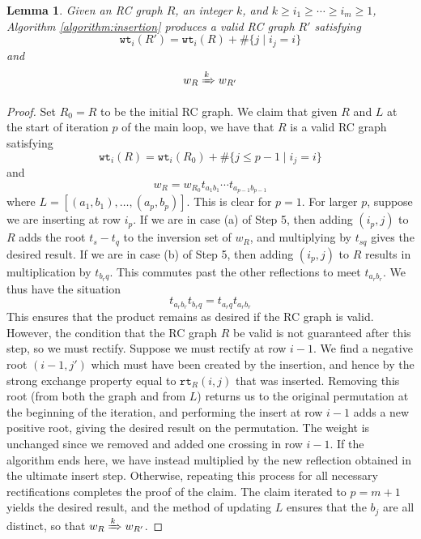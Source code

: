 \documentclass[a4paper,fleqn]{cas-sc}
\newtheorem{lemma}{Lemma}[subsection]
\theoremstyle{definition}
\theoremstyle{remark}
\numberwithin{equation}{subsection}
\newcommand{\wof}[1]{w_{#1}}
\newcommand{\wtt}{\mathtt{wt}}
\newcommand{\Tom}[1]{\xRightarrow{#1}}
\newcommand{\rtt}{\mathtt{rt}}
\begin{document}
\begin{lemma} \label{lemma:insertworks}
Given an RC graph $R$, an integer $k$, and $k\geq i_1\geq\cdots\geq i_m\geq 1$, Algorithm \ref{algorithm:insertion} produces a valid RC graph $R'$ satisfying
$$\wtt_i(R') = \wtt_i(R) + \#\{j \mid i_j = i\}$$
and
$$\wof{R}\Tom{k} \wof{R'}$$
\end{lemma}
\begin{proof}
Set $R_0=R$ to be the initial RC graph. We claim that given $R$ and $L$ at the start of iteration $p$ of the main loop, we have that $R$ is a valid RC graph satisfying
$$\wtt_i(R) = \wtt_i(R_0) + \#\{j \leq p-1 \mid i_j = i\}$$
and
$$\wof{R} = \wof{R_0}t_{a_1b_1}\cdots t_{a_{p-1}b_{p-1}}$$
where $L=[(a_1,b_1),\ldots,(a_p,b_p)]$. This is clear for $p=1$. For larger $p$, suppose we are inserting at row $i_p$. If we are in case (a) of Step 5, then adding $(i_p,j)$ to $R$ adds the root $t_s - t_q$ to the inversion set of $\wof{R}$, and multiplying by $t_{sq}$ gives the desired result. If we are in case (b) of Step 5, then adding $(i_p,j)$ to $R$ results in multiplication by $t_{b_rq}$. This commutes past the other reflections to meet $t_{a_rb_r}$. We thus have the situation
$$t_{a_rb_r}t_{b_rq} = t_{a_rq}t_{a_rb_r}$$
This ensures that the product remains as desired if the RC graph is valid. However, the condition that the RC graph $R$ be valid is not guaranteed after this step, so we must rectify. Suppose we must rectify at row $i - 1$. We find a negative root $(i-1, j')$ which must have been created by the insertion, and hence by the strong exchange property equal to $\rtt_R(i, j)$ that was inserted. Removing this root (from both the graph and from $L$) returns us to the original permutation at the beginning of the iteration, and performing the insert at row $i-1$ adds a new positive root, giving the desired result on the permutation. The weight is unchanged since we removed and added one crossing in row $i-1$. If the algorithm ends here, we have instead multiplied by the new reflection obtained in the ultimate insert step. Otherwise, repeating this process for all necessary rectifications completes the proof of the claim. The claim iterated to $p=m+1$ yields the desired result, and the method of updating $L$ ensures that the $b_j$ are all distinct, so that $\wof{R}\Tom{k} \wof{R'}$.
\end{proof}
\end{document}
